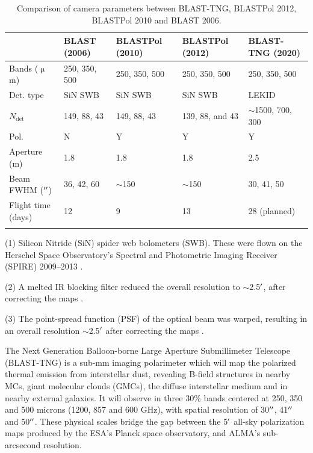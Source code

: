\begin{table}
\begin{threeparttable}
\centering
\begin{adjustbox}{width=\textwidth}
\begin{tabular}{@{}lllll@{}}
\dtoprule
 & BLAST (2006) & BLASTPol (2010) & BLASTPol (2012) & BLAST-TNG (2020) \\ \midrule
Bands ($\upmu$m) & 250, 350, 500 & 250, 350, 500 & 250, 350, 500 & 250, 350, 500 \\
Det. type & SiN SWB\tnote{1} & SiN SWB & SiN SWB & LEKID \\
$N_{\mathrm{det}}$ & 149, 88, 43 & 149, 88, 43 & 139, 88, and 43 & $\sim$1500, 700, 300 \\
Pol. & N & Y & Y & Y \\
Aperture (m) & 1.8 & 1.8 & 1.8 & 2.5 \\
Beam FWHM ($\operatorname{^{\prime\prime}}$) & 36, 42, 60 & $\sim$150\tnote{2} & $\sim$150\tnote{3} & 30, 41, 50 \\
Flight time (days) & 12 & 9 & 13 & 28 (planned) \\ \dbottomrule
\end{tabular}
\end{adjustbox}
\begin{tablenotes}
\item (1) Silicon Nitride (SiN) spider web bolometers (SWB). These were flown on the Herschel Space Observatory's Spectral and Photometric Imaging Receiver (SPIRE) 2009--2013 \citep{griffin2003spire}.
\item (2) A melted IR blocking filter reduced the overall resolution to $\sim$2.5$\operatorname{^{\prime}}$, after correcting the maps \citep{matthews2014lupus}.
\item (3) The point-spread function (PSF) of the optical beam was warped, resulting in an overall resolution $\sim$2.5$\operatorname{^{\prime}}$ after correcting the maps \citep{fissel2016balloon}.
\end{tablenotes}
\caption{Comparison of camera parameters between BLAST-TNG, BLASTPol 2012, BLASTPol 2010 and BLAST 2006.}
\label{tab:blast_comp}
\end{threeparttable}
\end{table}

The Next Generation Balloon-borne Large Aperture Submillimeter Telescope (BLAST-TNG) is a sub-mm imaging polarimeter which will map the polarized thermal emission from interstellar dust, revealing B-field structures in nearby MCs, giant molecular clouds (GMCs), the diffuse interstellar medium and in nearby external galaxies. It will observe in three 30\% bands centered at 250, 350 and 500 microns (1200, 857 and 600 GHz), with spatial resolution of 30$\operatorname{^{\prime\prime}}$, 41$\operatorname{^{\prime\prime}}$ and 50$\operatorname{^{\prime\prime}}$. These physical scales bridge the gap between the 5$\operatorname{^{\prime}}$ all-sky polarization maps produced by the ESA's Planck space observatory, and ALMA's sub-arcsecond resolution.

